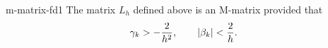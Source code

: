 \begin{Lemma}{m-matrix-fd1}
  The matrix $L_h$ defined above is an M-matrix provided that
  \begin{gather}
    \label{eq:fd:3}
    \gamma_k > -\frac2{h^2},
    \qquad
    \lvert\beta_k\rvert < \frac2h.
  \end{gather}
\end{Lemma}

